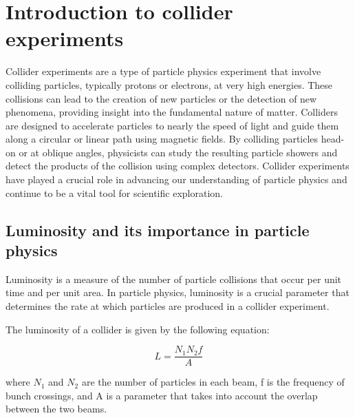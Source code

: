 \chapter{Introduction to collider experiments}  %

\ifpdf
    \graphicspath{{Chapter1/Figs/Raster/}{Chapter1/Figs/PDF/}{Chapter1/Figs/}}
\else
    \graphicspath{{Chapter1/Figs/Vector/}{Chapter1/Figs/}}
\fi


Collider experiments are a type of particle physics experiment that involve colliding particles, typically protons or electrons, at very high energies. These collisions can lead to the creation of new particles or the detection of new phenomena, providing insight into the fundamental nature of matter. Colliders are designed to accelerate particles to nearly the speed of light and guide them along a circular or linear path using magnetic fields. By colliding particles head-on or at oblique angles, physicists can study the resulting particle showers and detect the products of the collision using complex detectors. Collider experiments have played a crucial role in advancing our understanding of particle physics and continue to be a vital tool for scientific exploration.

\section{Luminosity and its importance in particle physics}

Luminosity is a measure of the number of particle collisions that occur per unit time and per unit area. In particle physics, luminosity is a crucial parameter that determines the rate at which particles are produced in a collider experiment.

The luminosity of a collider is given by the following equation:

\begin{equation}
L = \frac{N_1 N_2 f}{A} 
\end{equation}

where $N_1$ and $N_2$ are the number of particles in each beam, f is the frequency of bunch crossings, and A is a parameter that takes into account the overlap between the two beams.

